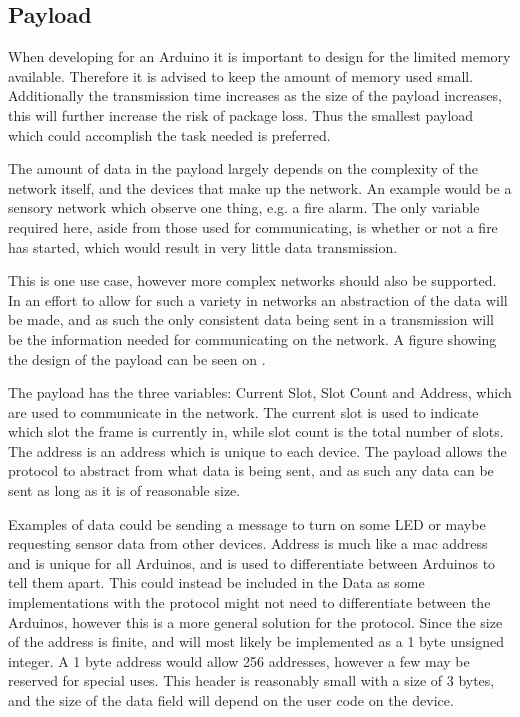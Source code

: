 \subsection{Payload}
When developing for an Arduino it is important to design for the limited memory available.
Therefore it is advised to keep the amount of memory used small.
Additionally the transmission time increases as the size of the payload increases, this will further increase the risk of package loss. 
Thus the smallest payload which could accomplish the task needed is preferred.
 
The amount of data in the payload largely depends on the complexity of the network itself, and the devices that make up the network.
An example would be a sensory network which observe one thing, e.g. a fire alarm. 
The only variable required here, aside from those used for communicating, is whether or not a fire has started, which would result in very little data transmission.

This is one use case, however more complex networks should also be supported. 
In an effort to allow for such a variety in networks an abstraction of the data will be made, and as such the only consistent data being sent in a transmission will be the information needed for communicating on the network.
A figure showing the design of the payload can be seen on .


\noindent%
The payload has the three variables: Current Slot, Slot Count and Address, which are used to communicate in the network.
The current slot is used to indicate which slot the frame is currently in, while slot count is the total number of slots.
The address is an address which is unique to each device. 
The payload allows the protocol to abstract from what data is being sent, and as such any data can be sent as long as it is of reasonable size. 

Examples of data could be sending a message to turn on some LED or maybe requesting sensor data from other devices.
Address is much like a mac address and is unique for all Arduinos, and is used to differentiate between Arduinos to tell them apart.
This could instead be included in the Data as some implementations with the protocol might not need to differentiate between the Arduinos, however this is a more general solution for the protocol.
Since the size of the address is finite, and will most likely be implemented as a 1 byte unsigned integer. 
A 1 byte address would allow 256 addresses, however a few may be reserved for special uses.
This header is reasonably small with a size of 3 bytes, and the size of the data field will depend on the user code on the device.
